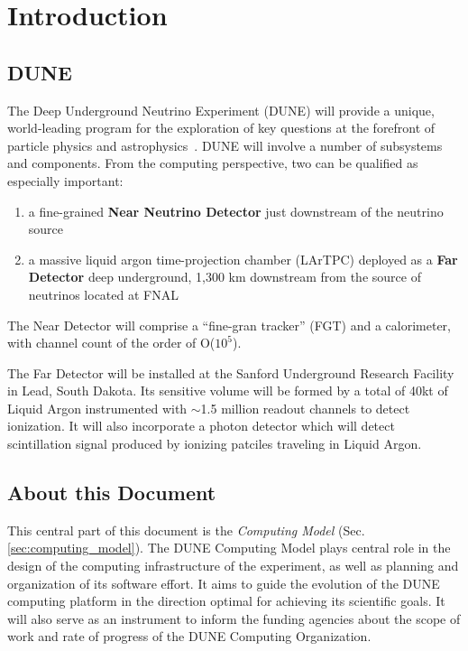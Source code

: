 \section{Introduction}
\subsection{DUNE}

The Deep Underground Neutrino Experiment (DUNE) will provide a unique, world-leading program
for the exploration of key questions at the forefront of particle physics and astrophysics~\cite{sciopps}.
DUNE will involve a number of subsystems and components. From the computing perspective, two can be
qualified as especially important:

\begin{enumerate}

\item a fine-grained \textbf{Near Neutrino Detector} just downstream of the neutrino source
\item a massive liquid argon time-projection chamber (LArTPC) deployed as a \textbf{Far
Detector} deep underground, 1,300 km downstream from the source of neutrinos located at FNAL

\end{enumerate}

The Near Detector will comprise a ``fine-gran tracker'' (FGT) and a calorimeter, with channel count of the order of O($10^{5}$).

The Far Detector will be installed at the Sanford Underground Research Facility in Lead, South Dakota.
Its sensitive volume will be formed by a total of 40kt of Liquid Argon instrumented with $\sim$1.5 million readout
channels to detect ionization. It will also incorporate a photon detector which will detect scintillation
signal produced by ionizing patciles traveling in Liquid Argon.



\subsection{About this Document}
\label{sec:modelrole}

This central part of this document is the \textit{Computing Model} (Sec.\ref{sec:computing_model}).
The DUNE Computing Model plays central role in the design of the computing infrastructure
of the experiment, as well as planning and organization of its software effort. It aims to guide the evolution of the DUNE computing platform in the direction
optimal for achieving its scientific goals. It will also serve as an instrument to inform the funding agencies about the scope of work and rate of progress of the DUNE  
Computing Organization.

